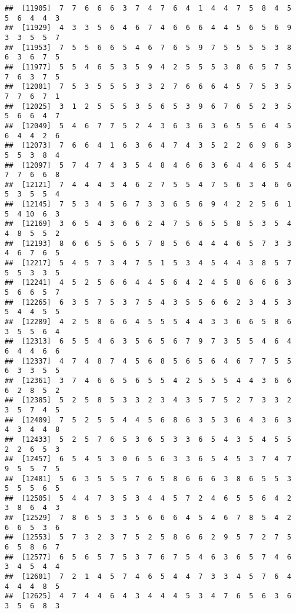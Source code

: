 \documentclass[
]{book}
\begin{document}
\begin{verbatim}
##  [11905]  7  7  6  6  6  3  7  4  7  6  4  1  4  4  7  5  8  4  5  5  6  4  4  3
##  [11929]  4  3  3  5  6  4  6  7  4  6  6  6  4  4  5  6  5  6  9  3  3  5  5  7
##  [11953]  7  5  5  6  6  5  4  6  7  6  5  9  7  5  5  5  5  3  8  6  3  6  7  5
##  [11977]  5  5  4  6  5  3  5  9  4  2  5  5  5  3  8  6  5  7  5  7  6  3  7  5
##  [12001]  7  5  3  5  5  5  3  3  2  7  6  6  6  4  5  7  5  3  5  7  7  6  7  1
##  [12025]  3  1  2  5  5  5  3  5  6  5  3  9  6  7  6  5  2  3  5  5  6  6  4  7
##  [12049]  5  4  6  7  7  5  2  4  3  6  3  6  3  6  5  5  6  4  5  6  4  4  2  6
##  [12073]  7  6  6  4  1  6  3  6  4  7  4  3  5  2  2  6  9  6  3  5  5  3  8  4
##  [12097]  5  7  4  7  4  3  5  4  8  4  6  6  3  6  4  4  6  5  4  7  7  6  6  8
##  [12121]  7  4  4  4  3  4  6  2  7  5  5  4  7  5  6  3  4  6  6  5  3  5  5  4
##  [12145]  7  5  3  4  5  6  7  3  3  6  5  6  9  4  2  2  5  6  1  5  4 10  6  3
##  [12169]  3  6  5  4  3  6  6  2  4  7  5  6  5  5  8  5  3  5  4  4  8  5  5  2
##  [12193]  8  6  6  5  5  6  5  7  8  5  6  4  4  4  6  5  7  3  3  4  6  7  6  5
##  [12217]  5  4  5  7  3  4  7  5  1  5  3  4  5  4  4  3  8  5  7  5  5  3  3  5
##  [12241]  4  5  2  5  6  6  4  4  5  6  4  2  4  5  8  6  6  6  3  5  6  6  5  7
##  [12265]  6  3  5  7  5  3  7  5  4  3  5  5  6  6  2  3  4  5  3  5  4  4  5  5
##  [12289]  4  2  5  8  6  6  4  5  5  5  4  4  3  3  6  6  5  8  6  3  5  5  6  4
##  [12313]  6  5  5  4  6  3  5  6  5  6  7  9  7  3  5  5  4  6  4  6  4  4  6  6
##  [12337]  4  7  4  8  7  4  5  6  8  5  6  5  6  4  6  7  7  5  5  6  3  3  5  5
##  [12361]  3  7  4  6  6  5  6  5  5  4  2  5  5  5  4  4  3  6  6  6  2  8  5  2
##  [12385]  5  2  5  8  5  3  3  2  3  4  3  5  7  5  2  7  3  3  2  3  5  7  4  5
##  [12409]  7  5  2  5  5  4  4  5  6  8  6  3  5  3  6  4  3  6  3  4  3  4  4  8
##  [12433]  5  2  5  7  6  5  3  6  5  3  3  6  5  4  3  5  4  5  5  2  2  6  5  3
##  [12457]  6  5  4  5  3  0  6  5  6  3  3  6  5  4  5  3  7  4  7  9  5  5  7  5
##  [12481]  5  6  3  5  5  5  7  6  5  8  6  6  6  3  8  6  5  5  3  5  5  5  6  5
##  [12505]  5  4  4  7  3  5  3  4  4  5  7  2  4  6  5  5  6  4  2  3  8  6  4  3
##  [12529]  7  8  6  5  3  3  5  6  6  6  4  5  4  6  7  8  5  4  2  6  6  5  3  6
##  [12553]  5  7  3  2  3  7  5  2  5  8  6  6  2  9  5  7  2  7  5  6  5  8  6  7
##  [12577]  6  5  6  5  7  5  3  7  6  7  5  4  6  3  6  5  7  4  6  3  4  5  4  4
##  [12601]  7  2  1  4  5  7  4  6  5  4  4  7  3  3  4  5  7  6  4  4  4  4  8  5
##  [12625]  4  7  4  4  6  4  3  4  4  4  5  3  4  7  6  5  6  3  6  3  5  6  8  3

\end{verbatim}
\end{document}
